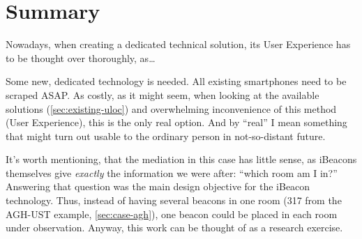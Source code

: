 \chapter{Summary}
\label{cha:summary}





Nowadays, when creating a dedicated technical solution, its User Experience has to be thought over thoroughly, as\ldots






 Some new, dedicated technology is needed. All existing smartphones need to be scraped ASAP. As costly, as it might seem, when looking at the available solutions (\cref{sec:existing-uloc}) and overwhelming inconvenience of this method (User Experience), this is the only real option. And by ``real'' I mean something that might turn out usable to the ordinary person in not-so-distant future.

It's worth mentioning, that the mediation in this case has little sense, as iBeacons themselves give \emph{exactly} the information we were after: ``which room am I in?'' Answering that question was the main design objective for the iBeacon technology. Thus, instead of having several beacons in one room (317 from the AGH-UST example, \cref{sec:case-agh}), one beacon could be placed in each room under observation. Anyway, this work can be thought of as a research exercise.
